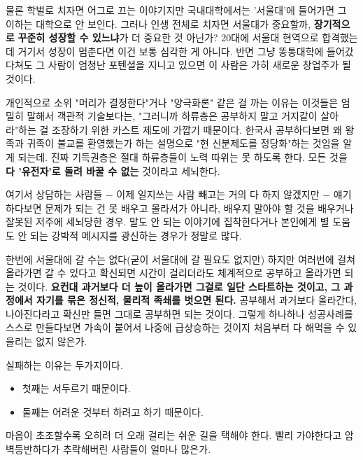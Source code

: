물론 학벌로 치자면 어그로 끄는 이야기지만 국내대학에서는  '서울대'에 들어가면 그 이하는 대학으로 안 보인다.
그러나 인생 전체로 치자면 서울대가 중요할까, \textbf{장기적으로} \textbf{꾸준히 성장할 수 있느냐}가 더 중요한 것 아닌가?
20대에 서울대 현역으로 합격했는데 거기서 성장이 멈춘다면 이건 보통 심각한 게 아니다.
반면 그냥 똥통대학에 들어갔다쳐도 그 사람이 엄청난 포텐셜을 지니고 있으면 이 사람은 가히 새로운 창업주가 될 것이다.
\vspace{5mm}

개인적으로 소위 "머리가 결정한다"거나 "양극화론" 같은 걸 까는 이유는
이것들은 엄밀히 말해서 객관적 기술보다는, "그러니까 하류층은 공부하지 말고 거지같이 살아라"하는 걸 조장하기 위한
카스트 제도에 가깝기 때문이다.
한국사 공부하다보면 왜 왕족과 귀족이 불교를 환영했는가 하는 설명으로 "현 신분제도를 정당화"하는 것임을 알게 되는데.
진짜 기득권층은 절대 하류층들이 노력 따위는 못 하도록 한다. 모든 것을 \textbf{다 '유전자'로 돌려 바꿀 수 없는} 것이라고 세뇌한다.
\vspace{5mm}

여기서 상담하는 사람들 $-$ 이제 일지쓰는 사람 빼고는 거의 다 하지 않겠지만 $-$
얘기하다보면 문제가 되는 건 못 배우고 몰라서가 아니라, 배우지 말아야 할 것을 배우거나 잘못된 저주에 세뇌당한 경우.
말도 안 되는 이야기에 집착한다거나 본인에게 별 도움도 안 되는 강박적 메시지를 광신하는 경우가 정말로 많다.
\vspace{5mm}

한번에 서울대에 갈 수는 없다(굳이 서울대에 갈 필요도 없지만)
하지만 여러번에 걸쳐 올라가면 갈 수 있다고 확신되면 시간이 걸리더라도 체계적으로 공부하고 올라가면 되는 것이다.
\textbf{요컨대 과거보다 더 높이 올라가면 그걸로 일단 스타트하는 것이고, 그 과정에서 자기를 묶은 정신적, 물리적 족쇄를 벗으면 된다.}
공부해서 과거보다 올라간다, 나아진다라고 확신만 들면 그대로 공부하면 되는 것이다.
그렇게 하나하나 성공사례를 스스로 만들다보면 가속이 붙어서 나중에 급상승하는 것이지
처음부터 다 해먹을 수 있을리는 없지 않은가.
\vspace{5mm}

실패하는 이유는 두가지이다.
\begin{itemize}
    \item 첫째는 서두르기 때문이다.
    \item 둘째는 어려운 것부터 하려고 하기 때문이다.
\end{itemize}
\vspace{5mm}

마음이 초조할수록 오히려 더 오래 걸리는 쉬운 길을 택해야 한다.
빨리 가야한다고 암벽등반하다가 추락해버린 사람들이 얼마나 많은가.
\vspace{5mm}

